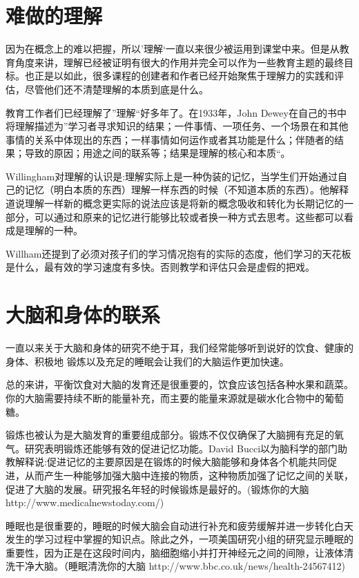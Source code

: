 \section{难做的理解}
    因为在概念上的难以把握，所以’理解‘一直以来很少被运用到课堂中来。但是从教育角度来讲，理解已经被证明有很大的作用并完全可以作为一些教育主题的最终目标。也正是以如此，很多课程的创建者和作者已经开始聚焦于理解力的实践和评估，尽管他们还不清楚理解的本质到底是什么。\par
    教育工作者们已经理解了”理解“好多年了。在1933年，John Dewey在自己的书中将理解描述为”学习者寻求知识的结果；一件事情、一项任务、一个场景在和其他事情的关系中体现出的东西；一样事情如何运作或者其功能是什么；伴随者的结果；导致的原因；用途之间的联系等；结果是理解的核心和本质“。\par
    Willingham对理解的认识是:理解实际上是一种伪装的记忆，当学生们开始通过自己的记忆（明白本质的东西）理解一样东西的时候（不知道本质的东西）。他解释道说理解一样新的概念更实际的说法应该是将新的概念吸收和转化为长期记忆的一部分，可以通过和原来的记忆进行能够比较或者换一种方式去思考。这些都可以看成是理解的一种。\par
    Willham还提到了必须对孩子们的学习情况抱有的实际的态度，他们学习的天花板是什么，最有效的学习速度有多快。否则教学和评估只会是虚假的把戏。\par

\section{大脑和身体的联系}
    一直以来关于大脑和身体的研究不绝于耳，我们经常能够听到说好的饮食、健康的身体、积极地 锻炼以及充足的睡眠会让我们的大脑运作更加快速。\par
    总的来讲，平衡饮食对大脑的发育还是很重要的，饮食应该包括各种水果和蔬菜。你的大脑需要持续不断的能量补充，而主要的能量来源就是碳水化合物中的葡萄糖。\par
    锻炼也被认为是大脑发育的重要组成部分。锻炼不仅仅确保了大脑拥有充足的氧气。研究表明锻炼还能够有效的促进记忆功能。David Bucci以为脑科学的部门助教解释说:促进记忆的主要原因是在锻炼的时候大脑能够和身体各个机能共同促进，从而产生一种能够加强大脑中连接的物质，这种物质加强了记忆之间的关联，促进了大脑的发展。研究报名年轻的时候锻炼是最好的。(锻炼你的大脑  http://www.medicalnewstoday.com/)\par
    睡眠也是很重要的，睡眠的时候大脑会自动进行补充和疲劳缓解并进一步转化白天发生的学习过程中掌握的知识点。除此之外，一项美国研究小组的研究显示睡眠的重要性，因为正是在这段时间内，脑细胞缩小并打开神经元之间的间隙，让液体清洗干净大脑。（睡眠清洗你的大脑  http://www.bbc.co.uk/news/health-24567412)\par

